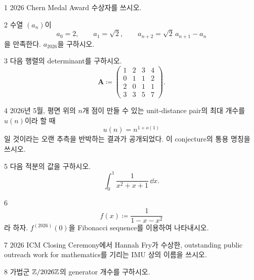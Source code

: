 \documentclass[11pt,oneside]{article}
\begin{document}

\begin{problem}{1}
2026 Chern Medal Award 수상자를 쓰시오.
\end{problem}

\begin{problem}{2}
수열 $(a_n)$이
\[
    a_0=2,
    \qquad
    a_1=\sqrt2,
    \qquad
    a_{n+2}=\sqrt2\,a_{n+1}-a_n
\]
을 만족한다. $a_{2026}$을 구하시오.
\end{problem}

\begin{problem}{3}
다음 행렬의 determinant를 구하시오.
\[
    \mathbf{A}
    \coloneqq
    \begin{pmatrix}
        1&2&3&4\\
        0&1&1&2\\
        2&0&1&1\\
        3&3&5&7
    \end{pmatrix}.
\]
\end{problem}

\begin{problem}{4}
2026년 5월, 평면 위의 $n$개 점이 만들 수 있는 unit-distance pair의 최대 개수를 $u(n)$이라 할 때
\[
    u(n)=n^{1+o(1)}
\]
일 것이라는 오랜 추측을 반박하는 결과가 공개되었다. 이 conjecture의 통용 명칭을 쓰시오.
\end{problem}

\begin{problem}{5}
다음 적분의 값을 구하시오.
\[
    \int_0^1\frac{1}{x^2+x+1}\,\dd x.
\]
\end{problem}

\begin{problem}{6}
\[
    f(x)\coloneqq \frac{1}{1-x-x^2}
\]
라 하자. $f^{(2026)}(0)$을 Fibonacci sequence를 이용하여 나타내시오.
\end{problem}

\newpage

\begin{problem}{7}
2026 ICM Closing Ceremony에서 Hannah Fry가 수상한, outstanding public outreach work for mathematics를 기리는 IMU 상의 이름을 쓰시오.
\end{problem}

\begin{problem}{8}
가법군 $\mathbb{Z}/2026\mathbb{Z}$의 generator 개수를 구하시오.
\end{problem}
\end{document}
